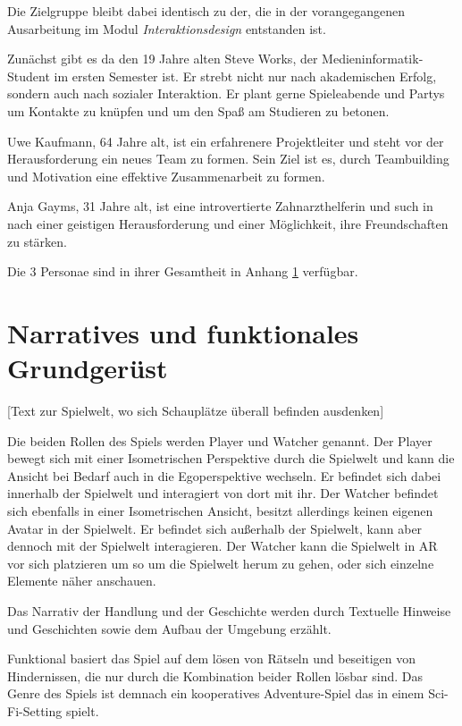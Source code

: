 Die Zielgruppe bleibt dabei identisch zu der, die in der vorangegangenen Ausarbeitung im Modul \emph{Interaktionsdesign} entstanden ist.

Zunächst gibt es da den 19 Jahre alten Steve Works, der Medieninformatik-Student im ersten Semester ist. Er strebt nicht nur nach akademischen Erfolg, sondern auch nach sozialer Interaktion. Er plant gerne Spieleabende und Partys um Kontakte zu knüpfen und um den Spaß am Studieren zu betonen.

Uwe Kaufmann, 64 Jahre alt, ist ein erfahrenere Projektleiter und steht vor der Herausforderung ein neues Team zu formen. Sein Ziel ist es, durch Teambuilding und Motivation eine effektive Zusammenarbeit zu formen.

Anja Gayms, 31 Jahre alt, ist eine introvertierte Zahnarzthelferin und such in  nach einer geistigen Herausforderung und einer Möglichkeit, ihre Freundschaften zu stärken.

Die 3 Personae sind in ihrer Gesamtheit in Anhang \ref{} verfügbar.


\section{Narratives und funktionales Grundgerüst}
[Text zur Spielwelt, wo sich Schauplätze überall befinden ausdenken]

Die beiden Rollen des Spiels werden Player und Watcher genannt. Der Player bewegt sich mit einer Isometrischen Perspektive durch die Spielwelt und kann die Ansicht bei Bedarf auch in die Egoperspektive wechseln. Er befindet sich dabei innerhalb der Spielwelt und interagiert von dort mit ihr.
Der Watcher befindet sich ebenfalls in einer Isometrischen Ansicht, besitzt allerdings keinen eigenen Avatar in der Spielwelt. Er befindet sich außerhalb der Spielwelt, kann aber dennoch mit der Spielwelt interagieren. Der Watcher kann die Spielwelt in \ac{AR} vor sich platzieren um so um die Spielwelt herum zu gehen, oder sich einzelne Elemente näher anschauen.

Das Narrativ der Handlung und der Geschichte werden durch Textuelle Hinweise und Geschichten sowie dem Aufbau der Umgebung erzählt. 

Funktional basiert das Spiel auf dem lösen von Rätseln und beseitigen von Hindernissen, die nur durch die Kombination beider Rollen lösbar sind. Das Genre des Spiels ist demnach ein kooperatives Adventure-Spiel das in einem \ac{Sci-Fi}-Setting spielt.

